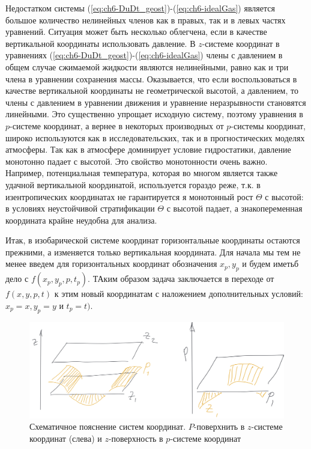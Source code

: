     Недостатком системы (\ref{eq:ch6-DuDt_geost})-(\ref{eq:ch6-idealGas}) является большое количество нелинейных членов как в правых, так и в левых частях уравнений. Ситуация может быть несколько облегчена, если в качестве вертикальной координаты использовать давление. В $z$-системе координат в уравнениях (\ref{eq:ch6-DuDt_geost})-(\ref{eq:ch6-idealGas}) члены с давлением в общем случае сжимаемой жидкости являются нелинейными, равно как и три члена в уравнении сохранения массы. Оказывается, что если воспользоваться в качестве вертикальной координаты не геометрической высотой, а давлением, то члены с давлением в уравнении движения и уравнение неразрывности становятся линейными. Это существенно упрощает исходную систему, поэтому уравнения в $p$-системе координат, а вернее в некоторых производных от $p$-системы координат, широко используются как в исследовательских, так и в прогностических моделях атмосферы. Так как в атмосфере доминирует условие гидростатики, давление монотонно падает с высотой. Это свойство монотонности очень важно. Например, потенциальная температура, которая во многом является также удачной вертикальной координатой, используется гораздо реже, т.к. в изентропических координатах не гарантируется я монотонный рост $\Theta$ с высотой: в условиях неустойчивой стратификации $\Theta$ с высотой падает, а знакопеременная координата крайне неудобна для анализа.

    Итак, в изобарической системе координат горизонтальные координаты остаются прежними, а изменяется только вертикальная координата. Для начала мы тем не менее введем для горизонтальных координат обозначения $x_p, y_p$ и будем иметьб дело с $f(x_p,y_p,p,t_p)$. ТАким образом задача заключается в переходе от  $f(x,y,p,t)$ к этим новый координатам с наложением дополнительных условий: $x_p=x,y_p=y$ и $t_p=t)$.

    \begin{figure}[h]
    \centering
    \includegraphics[width=0.9\linewidth]{pics/ch6.1.png}
    \caption{\label{fig:ch6.1}
    Схематичное пояснение систем координат. $P$-поверхнить в $z$-системе координат (слева) и $z$-поверхность в $p$-системе координат
    }
    \end{figure}    

